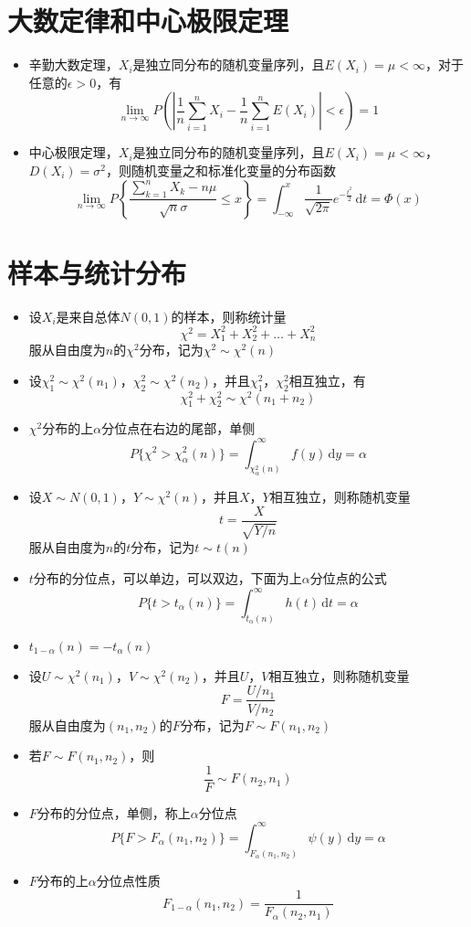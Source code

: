 \documentclass[UTF8]{ctexart}
\newcommand{\ud}{\,\mathrm{d}}
\begin{document}
\section{大数定律和中心极限定理}
\begin{itemize}


\item 辛勤大数定理，$X_i$是独立同分布的随机变量序列，且$E(X_i)=\mu<\infty$，对于任意的$\epsilon>0$，有
\[
	\lim_{n\to \infty}P\left(\left| \frac{1}{n}\sum_{i=1}^nX_i-\frac{1}{n}\sum_{i=1}^nE(X_i)\right|<\epsilon \right) = 1
\]

\item 中心极限定理，$X_i$是独立同分布的随机变量序列，且$E(X_i)=\mu<\infty$，$D(X_i)=\sigma^2$，则随机变量之和标准化变量的分布函数
\[
	\lim_{n\to \infty} P\left\{\frac{\sum_{k=1}^n X_k-n\mu}{\sqrt{n}\sigma}\leq x \right\} = \int_{-\infty}^x \frac{1}{\sqrt{2\pi}}e^{-\frac{t^2}{2}}\ud{t} = \Phi(x)
\]

\end{itemize}


\section{样本与统计分布}
\begin{itemize}
	\item 设$X_i$是来自总体$N(0,1)$的样本，则称统计量
	\[
		\chi^2 = X_1^2 + X_2^2 + \dots + X_n^2
	\]
	服从自由度为$n$的$\chi^2$分布，记为$\chi^2 \sim \chi^2(n)$
	\item 设$\chi_1^2 \sim \chi^2(n_1)$，$\chi_2^2 \sim \chi^2(n_2)$，并且$\chi_1^2$，$\chi_2^2$相互独立，有
	\[
		\chi_1^2 + \chi_2^2 \sim \chi^2(n_1 + n_2)
	\]
	\item $\chi^2$分布的上$\alpha$分位点在右边的尾部，单侧
	\[
		P\{\chi^2 > \chi_\alpha^2(n)\} = \int_{\chi_\alpha^2(n)}^\infty f(y) \ud y = \alpha
	\]

	\item 设$X \sim N(0,1)$，$Y \sim \chi^2(n)$，并且$X$，$Y$相互独立，则称随机变量
	\[
		t = \frac{X}{\sqrt{Y/n}}
	\]
	服从自由度为$n$的$t$分布，记为$t\sim t(n)$

	\item $t$分布的分位点，可以单边，可以双边，下面为上$\alpha$分位点的公式
	\[
		P\{t > t_\alpha (n)\} = \int_{t_\alpha (n)}^\infty h(t)\ud t = \alpha
	\]

	\item $ t_{1-\alpha} (n) = -t_\alpha (n)$


	\item 设$U \sim \chi^2(n_1)$，$V \sim \chi^2(n_2)$，并且$U$，$V$相互独立，则称随机变量
	\[
		F = \frac{U/n_1}{V/n_2}
	\]
	服从自由度为$(n_1,n_2)$的$F$分布，记为$F\sim F(n_1,n_2)$

	\item 若$F\sim F(n_1,n_2)$，则
	\[
		\frac{1}{F} \sim F(n_2,n_1)
	\]
	\item $F$分布的分位点，单侧，称上$\alpha$分位点
	\[
		P\{F> F_\alpha(n_1,n_2)\} = \int_{F_\alpha(n_1,n_2)} ^ \infty \psi(y) \ud y = \alpha
	\]

	\item $F$分布的上$\alpha$分位点性质
	\[
		F_{1-\alpha}(n_1,n_2) = \frac{1}{F_\alpha(n_2,n_1)}
	\]
\end{itemize}
\end{document}

